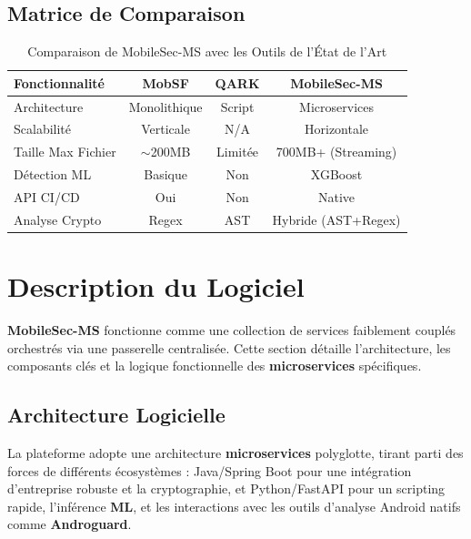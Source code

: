 \documentclass[
  journal=largetwo,
  manuscript=article-type,
  year=2025,
  volume=1,
]{cup-journal}
\begin{document}
\subsection{Matrice de Comparaison}
\begin{table}[hbt!]
\centering
\caption{Comparaison de MobileSec-MS avec les Outils de l'État de l'Art}
\begin{tabular}{p{3cm}ccc}
\toprule
\textbf{Fonctionnalité} & \textbf{MobSF} & \textbf{QARK} & \textbf{MobileSec-MS} \\
\midrule
Architecture & Monolithique & Script & Microservices \\
Scalabilité & Verticale & N/A & Horizontale \\
Taille Max Fichier & $\sim$200MB & Limitée & 700MB+ (Streaming) \\
Détection ML & Basique & Non & XGBoost \\
API CI/CD & Oui & Non & Native \\
Analyse Crypto & Regex & AST & Hybride (AST+Regex) \\
\bottomrule
\end{tabular}
\label{tab-comparison}
\end{table}

\section{Description du Logiciel}
\label{sec-description}

\textbf{MobileSec-MS} fonctionne comme une collection de services faiblement couplés orchestrés via une passerelle centralisée. Cette section détaille l'architecture, les composants clés et la logique fonctionnelle des \textbf{microservices} spécifiques.

\subsection{Architecture Logicielle}
La plateforme adopte une architecture \textbf{microservices} polyglotte, tirant parti des forces de différents écosystèmes : Java/Spring Boot pour une intégration d'entreprise robuste et la cryptographie, et Python/FastAPI pour un scripting rapide, l'inférence \textbf{ML}, et les interactions avec les outils d'analyse Android natifs comme \textbf{Androguard}.
\end{document}
